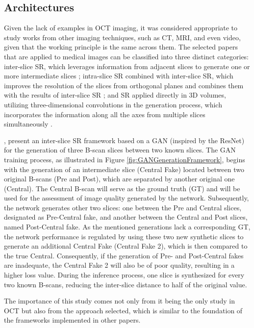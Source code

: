 \subsection{Architectures}
Given the lack of examples in OCT imaging, it was considered appropriate to study works from other imaging techniques, such as CT, MRI, and even video, given that the working principle is the same across them. The selected papers that are applied to medical images can be classified into three distinct categories: inter-slice SR, which leverages information from adjacent slices to generate one or more intermediate slices \parencite{Lopez2023, Xia2021, Wu2022, Nishimoto2024}; intra-slice SR combined with inter-slice SR, which improves the resolution of the slices from orthogonal planes and combines them with the results of inter-slice SR \parencite{Zhang2024, Fang2022, Nimitha2024, Georgescu2020}; and SR applied directly in 3D volumes, utilizing three-dimensional convolutions in the generation process, which incorporates the information along all the axes from multiple slices simultaneously \parencite{YChen2018, Sanchez2018, Kudo2019, Zhang2022}.
\par
\textcite{Lopez2023}, present an inter-slice SR framework based on a GAN (inspired by the ResNet) for the generation of three B-scan slices between two known slices. The GAN training process, as illustrated in Figure \ref{fig:GANGenerationFramework}, begins with the generation of an intermediate slice (Central Fake) located between two original B-scans (Pre and Post), which are separated by another original one (Central). The Central B-scan will serve as the ground truth (GT) and will be used for the assessment of image quality generated by the network. Subsequently, the network generates other two slices: one between the Pre and Central slices, designated as Pre-Central fake, and another between the Central and Post slices, named Post-Central fake. As the mentioned generations lack a corresponding GT, the network performance is regulated by using these two new synthetic slices to generate an additional Central Fake (Central Fake 2), which is then compared to the true Central. Consequently, if the generation of Pre- and Post-Central fakes are inadequate, the Central Fake 2 will also be of poor quality, resulting in a higher loss value. During the inference process, one slice is synthesized for every two known B-scans, reducing the inter-slice distance to half of the original value.
\par
The importance of this study comes not only from it being the only study in OCT but also from the approach selected, which is similar to the foundation of the frameworks implemented in other papers. 

